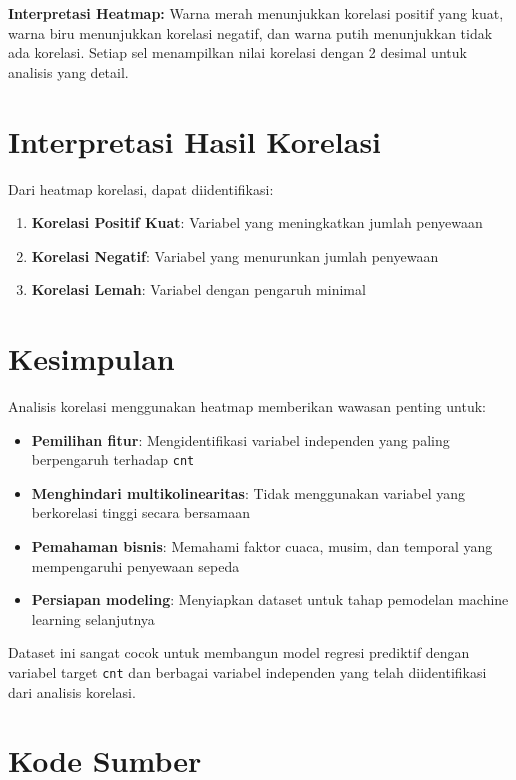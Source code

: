 \documentclass[11pt,a4paper]{article}
\begin{document}
    \begin{tcolorbox}
        \textbf{Interpretasi Heatmap:} Warna merah menunjukkan korelasi positif yang kuat, warna biru menunjukkan korelasi negatif, dan warna putih menunjukkan tidak ada korelasi.
        \hspace{1cm}Setiap sel menampilkan nilai korelasi dengan 2 desimal untuk analisis yang detail.
    \end{tcolorbox}


    \section{Interpretasi Hasil Korelasi}
    Dari heatmap korelasi, dapat diidentifikasi:

    \begin{enumerate}
        \item \textbf{Korelasi Positif Kuat}: Variabel yang meningkatkan jumlah penyewaan
        \item \textbf{Korelasi Negatif}: Variabel yang menurunkan jumlah penyewaan
        \item \textbf{Korelasi Lemah}: Variabel dengan pengaruh minimal
    \end{enumerate}


    \section{Kesimpulan}
    Analisis korelasi menggunakan heatmap memberikan wawasan penting untuk:
    \begin{itemize}
        \item \textbf{Pemilihan fitur}: Mengidentifikasi variabel independen yang paling berpengaruh terhadap \texttt{cnt}
        \item \textbf{Menghindari multikolinearitas}: Tidak menggunakan variabel yang berkorelasi tinggi secara bersamaan
        \item \textbf{Pemahaman bisnis}: Memahami faktor cuaca, musim, dan temporal yang mempengaruhi penyewaan sepeda
        \item \textbf{Persiapan modeling}: Menyiapkan dataset untuk tahap pemodelan machine learning selanjutnya
    \end{itemize}

    Dataset ini sangat cocok untuk membangun model regresi prediktif dengan variabel target \texttt{cnt} dan berbagai variabel independen yang telah diidentifikasi dari analisis korelasi.


    \section{Kode Sumber}
\end{document}
